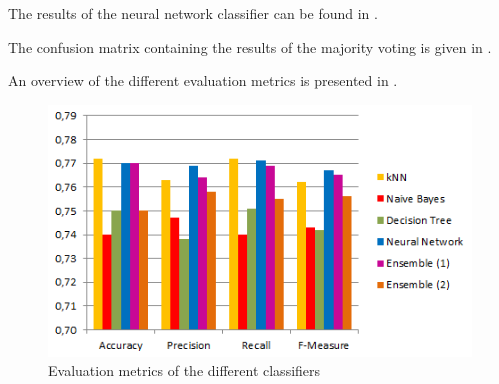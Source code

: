 The results of the neural network classifier can be found in .
\begin{table}[H]
	\centering
	\caption{Confusion matrix of the Neural Network}
	\label{tab:mat-nn}
\end{table}

The confusion matrix containing the results of the majority voting is given in .

\begin{table}[H]
	\centering
	\caption{Confusion matrix of the ensemble}
	\label{tab:mat-vote}
\end{table}

An overview of the different evaluation metrics is presented in .
\begin{figure}[H]
	\centering
	\includegraphics[width=\columnwidth]{../../charts/results.png}
	\caption{Evaluation metrics of the different classifiers}
	\label{fig:result}
\end{figure}

